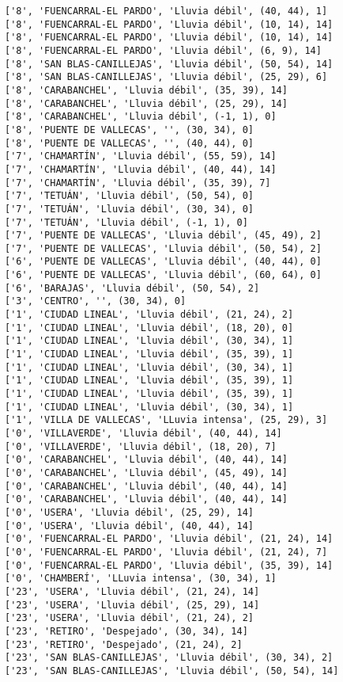 \documentclass[11pt]{article}
\begin{document}
\begin{Verbatim}[commandchars=\\\{\}]
['8', 'FUENCARRAL-EL PARDO', 'Lluvia débil', (40, 44), 1]
['8', 'FUENCARRAL-EL PARDO', 'Lluvia débil', (10, 14), 14]
['8', 'FUENCARRAL-EL PARDO', 'Lluvia débil', (10, 14), 14]
['8', 'FUENCARRAL-EL PARDO', 'Lluvia débil', (6, 9), 14]
['8', 'SAN BLAS-CANILLEJAS', 'Lluvia débil', (50, 54), 14]
['8', 'SAN BLAS-CANILLEJAS', 'Lluvia débil', (25, 29), 6]
['8', 'CARABANCHEL', 'Lluvia débil', (35, 39), 14]
['8', 'CARABANCHEL', 'Lluvia débil', (25, 29), 14]
['8', 'CARABANCHEL', 'Lluvia débil', (-1, 1), 0]
['8', 'PUENTE DE VALLECAS', '', (30, 34), 0]
['8', 'PUENTE DE VALLECAS', '', (40, 44), 0]
['7', 'CHAMARTÍN', 'Lluvia débil', (55, 59), 14]
['7', 'CHAMARTÍN', 'Lluvia débil', (40, 44), 14]
['7', 'CHAMARTÍN', 'Lluvia débil', (35, 39), 7]
['7', 'TETUÁN', 'Lluvia débil', (50, 54), 0]
['7', 'TETUÁN', 'Lluvia débil', (30, 34), 0]
['7', 'TETUÁN', 'Lluvia débil', (-1, 1), 0]
['7', 'PUENTE DE VALLECAS', 'Lluvia débil', (45, 49), 2]
['7', 'PUENTE DE VALLECAS', 'Lluvia débil', (50, 54), 2]
['6', 'PUENTE DE VALLECAS', 'Lluvia débil', (40, 44), 0]
['6', 'PUENTE DE VALLECAS', 'Lluvia débil', (60, 64), 0]
['6', 'BARAJAS', 'Lluvia débil', (50, 54), 2]
['3', 'CENTRO', '', (30, 34), 0]
['1', 'CIUDAD LINEAL', 'Lluvia débil', (21, 24), 2]
['1', 'CIUDAD LINEAL', 'Lluvia débil', (18, 20), 0]
['1', 'CIUDAD LINEAL', 'Lluvia débil', (30, 34), 1]
['1', 'CIUDAD LINEAL', 'Lluvia débil', (35, 39), 1]
['1', 'CIUDAD LINEAL', 'Lluvia débil', (30, 34), 1]
['1', 'CIUDAD LINEAL', 'Lluvia débil', (35, 39), 1]
['1', 'CIUDAD LINEAL', 'Lluvia débil', (35, 39), 1]
['1', 'CIUDAD LINEAL', 'Lluvia débil', (30, 34), 1]
['1', 'VILLA DE VALLECAS', 'LLuvia intensa', (25, 29), 3]
['0', 'VILLAVERDE', 'Lluvia débil', (40, 44), 14]
['0', 'VILLAVERDE', 'Lluvia débil', (18, 20), 7]
['0', 'CARABANCHEL', 'Lluvia débil', (40, 44), 14]
['0', 'CARABANCHEL', 'Lluvia débil', (45, 49), 14]
['0', 'CARABANCHEL', 'Lluvia débil', (40, 44), 14]
['0', 'CARABANCHEL', 'Lluvia débil', (40, 44), 14]
['0', 'USERA', 'Lluvia débil', (25, 29), 14]
['0', 'USERA', 'Lluvia débil', (40, 44), 14]
['0', 'FUENCARRAL-EL PARDO', 'Lluvia débil', (21, 24), 14]
['0', 'FUENCARRAL-EL PARDO', 'Lluvia débil', (21, 24), 7]
['0', 'FUENCARRAL-EL PARDO', 'Lluvia débil', (35, 39), 14]
['0', 'CHAMBERÍ', 'LLuvia intensa', (30, 34), 1]
['23', 'USERA', 'Lluvia débil', (21, 24), 14]
['23', 'USERA', 'Lluvia débil', (25, 29), 14]
['23', 'USERA', 'Lluvia débil', (21, 24), 2]
['23', 'RETIRO', 'Despejado', (30, 34), 14]
['23', 'RETIRO', 'Despejado', (21, 24), 2]
['23', 'SAN BLAS-CANILLEJAS', 'Lluvia débil', (30, 34), 2]
['23', 'SAN BLAS-CANILLEJAS', 'Lluvia débil', (50, 54), 14]

\end{Verbatim}
\end{document}
